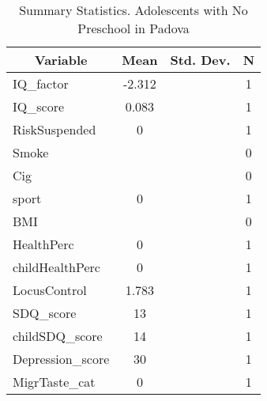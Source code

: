 
\begin{table}[htbp]\centering \caption{Summary Statistics. Adolescents with No Preschool in Padova \label{bothAdolmaternaNonePadova}}
\begin{tabular}{l c c  c}\hline\hline
\multicolumn{1}{c}{\textbf{Variable}} & \textbf{Mean}
 & \textbf{Std. Dev.} & \textbf{N}\\ \hline
IQ\_factor & -2.312 &   & 1\\
IQ\_score & 0.083 &   & 1\\
RiskSuspended & 0 &   & 1\\
Smoke &  &   & 0\\
Cig &  &   & 0\\
sport & 0 &   & 1\\
BMI &  &   & 0\\
HealthPerc & 0 &   & 1\\
childHealthPerc & 0 &   & 1\\
LocusControl & 1.783 &   & 1\\
SDQ\_score & 13 &   & 1\\
childSDQ\_score & 14 &   & 1\\
Depression\_score & 30 &   & 1\\
MigrTaste\_cat & 0 &   & 1\\
\hline\end{tabular}
\end{table}
